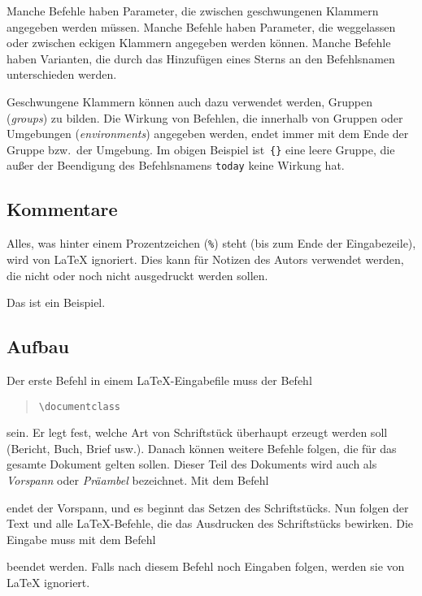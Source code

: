 Manche Befehle haben Parameter, die zwischen geschwungenen Klammern angegeben 
werden müssen. Manche Befehle haben Parameter, die weggelassen oder zwischen
eckigen Klammern angegeben werden können. Manche Befehle haben Varianten, die 
durch das Hinzufügen eines Sterns an den Befehlsnamen unterschieden werden.

Geschwungene Klammern können auch dazu verwendet werden, Gruppen (\emph{groups})
zu bilden. Die Wirkung von Befehlen, die innerhalb von Gruppen oder Umgebungen 
(\emph{environments}) angegeben werden, endet immer mit dem Ende der Gruppe 
bzw.\ der Umgebung.  Im obigen Beispiel ist~\verb|{}| eine leere Gruppe, die 
außer der Beendigung des Befehlsnamens \texttt{today} keine Wirkung hat.
 
\subsection{Kommentare}
 
Alles, was hinter einem Prozentzeichen (\verb|%|) steht (bis zum Ende der 
Eingabezeile), wird von \LaTeX{} ignoriert. Dies kann für Notizen des Autors 
verwendet werden, die nicht oder noch nicht ausgedruckt werden sollen.
\begin{LTXexample}
Das ist ein %
Beispiel. 
\end{LTXexample}
 
\subsection{Aufbau}
 
Der erste Befehl in einem \LaTeX-Eingabefile muss der Befehl
\begin{quote}
\verb|\documentclass|
\end{quote}
sein. Er legt fest, welche Art von Schriftstück überhaupt erzeugt werden soll
(Bericht, Buch, Brief usw.). Danach können weitere Befehle folgen, die für das
gesamte Dokument gelten sollen.  Dieser Teil des Dokuments wird auch als 
\emph{Vorspann} oder \emph{Präambel} bezeichnet.  Mit dem Befehl
\begin{quote}
\verb||
\end{quote}
endet der Vorspann, und es beginnt das Setzen des Schriftstücks. Nun folgen der 
Text und alle \LaTeX-Befehle, die das Ausdrucken des Schriftstücks bewirken.
Die Eingabe muss mit dem Befehl
\begin{quote}
\verb||
\end{quote}
beendet werden. Falls nach diesem Befehl noch Eingaben folgen, werden sie von
\LaTeX{} ignoriert.
 
